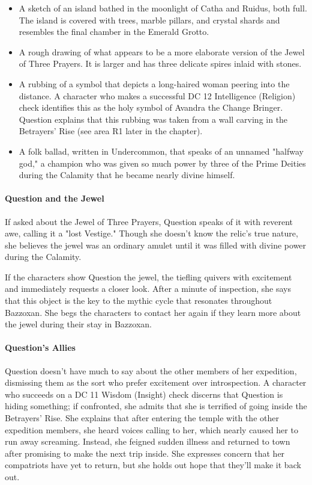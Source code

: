 \documentclass[10pt,a4paper,twoside,twocolumn,openany,nodeprecatedcode]{dndbook}
\begin{document}
\begin{itemize}
\item A sketch of an island bathed in the moonlight of Catha and Ruidus, both full. The island is covered with trees, marble pillars, and crystal shards and resembles the final chamber in the Emerald Grotto.
\item A rough drawing of what appears to be a more elaborate version of the Jewel of Three Prayers. It is larger and has three delicate spires inlaid with stones.
\item A rubbing of a symbol that depicts a long-haired woman peering into the distance. A character who makes a successful DC 12 Intelligence (Religion) check identifies this as the holy symbol of Avandra the Change Bringer. Question explains that this rubbing was taken from a wall carving in the Betrayers' Rise (see area R1 later in the chapter).
\item A folk ballad, written in Undercommon, that speaks of an unnamed "halfway god," a champion who was given so much power by three of the Prime Deities during the Calamity that he became nearly divine himself.
\end{itemize}

\paragraph{Question and the Jewel}
If asked about the Jewel of Three Prayers, Question speaks of it with reverent awe, calling it a "lost Vestige." Though she doesn't know the relic's true nature, she believes the jewel was an ordinary amulet until it was filled with divine power during the Calamity.

If the characters show Question the jewel, the tiefling quivers with excitement and immediately requests a closer look. After a minute of inspection, she says that this object is the key to the mythic cycle that resonates throughout Bazzoxan. She begs the characters to contact her again if they learn more about the jewel during their stay in Bazzoxan.

\paragraph{Question's Allies}
Question doesn't have much to say about the other members of her expedition, dismissing them as the sort who prefer excitement over introspection. A character who succeeds on a DC 11 Wisdom (Insight) check discerns that Question is hiding something; if confronted, she admits that she is terrified of going inside the Betrayers' Rise. She explains that after entering the temple with the other expedition members, she heard voices calling to her, which nearly caused her to run away screaming. Instead, she feigned sudden illness and returned to town after promising to make the next trip inside. She expresses concern that her compatriots have yet to return, but she holds out hope that they'll make it back out.
\end{document}
